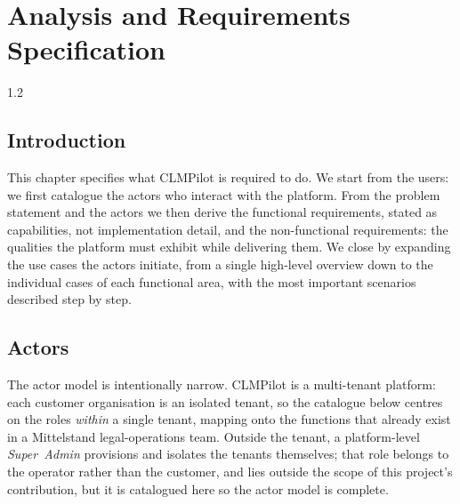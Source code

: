 \setcounter{chapter}{1}
\chapter{Analysis and Requirements Specification}
\label{chap:analysis}
\graphicspath{{Chapter2/figures/}}

\pagestyle{fancy}
\fancyhf{}
\fancyhead[R]{\bfseries\rightmark}
\fancyfoot[R]{\thepage}
\renewcommand{\headrulewidth}{0.5pt}
\renewcommand{\footrulewidth}{0pt}
\renewcommand{\chaptermark}[1]{\markboth{{\chaptername~\thechapter.\ #1}}{}}
\renewcommand{\sectionmark}[1]{\markright{\thesection~ #1}}

\begin{spacing}{1.2}

\section*{Introduction}
This chapter specifies what CLMPilot is required to do. We start from
the users: we first catalogue the actors who interact with the
platform. From the problem statement and the actors we then derive the
functional requirements, stated as capabilities, not implementation
detail, and the non-functional requirements: the qualities the platform
must exhibit while delivering them. We close by expanding the use cases
the actors initiate, from a single high-level overview down to the
individual cases of each functional area, with the most important
scenarios described step by step.

\section{Actors}
\label{sec:actors}

The actor model is intentionally narrow. CLMPilot is a multi-tenant
platform: each customer organisation is an isolated tenant, so the
catalogue below centres on the roles \emph{within} a single tenant,
mapping onto the functions that already exist in a Mittelstand
legal-operations team. Outside the tenant, a platform-level
\emph{Super~Admin} provisions and isolates the tenants themselves; that
role belongs to the operator rather than the customer, and lies outside
the scope of this project's contribution, but it is catalogued here so
the actor model is complete.


\end{spacing}
